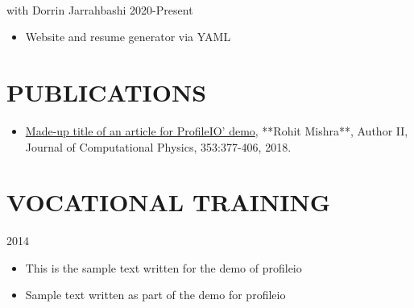 \documentclass{res}
\begin{document}
\begin{resume}
	\hspace*{-0.25in}{\bf Degassing in diesel injector nozzles} \\
	\hspace*{-0.25in}with Dorrin Jarrahbashi \hfill 2020-Present
	\begin{itemize}[leftmargin=\parindent]
	\setlength{\itemsep}{0mm} \smallskip
	
	\item Website and resume generator via YAML
	\end{itemize}
	
	
	
	\section{\MakeUppercase{Publications}} \vskip 0.35in
	\begin{itemize}[leftmargin=\parindent]
	\setlength{\itemsep}{4pt}
	
	\item[] \href{https://www.sciencedirect.com/science/article/pii/S0021999117307696}{Made-up title of an article for ProfileIO' demo}, **Rohit Mishra**, Author II, Journal of Computational Physics, 353:377-406, 2018.
	\end{itemize}
	
	
	
	\section{\MakeUppercase{Vocational Training}} \vskip 0.15in
	
	\hspace*{-0.25in}{\bf Trainee} \hfill 2014 \\
	\hspace*{-0.25in}{\it Animation Studios}
	\begin{itemize}[leftmargin=\parindent]
	\setlength{\itemsep}{0mm} \smallskip
	
		\item This is the sample text written for the demo of profileio
		\item Sample text written as part of the demo for profileio
	\end{itemize}
	

\end{resume}
\end{document}
